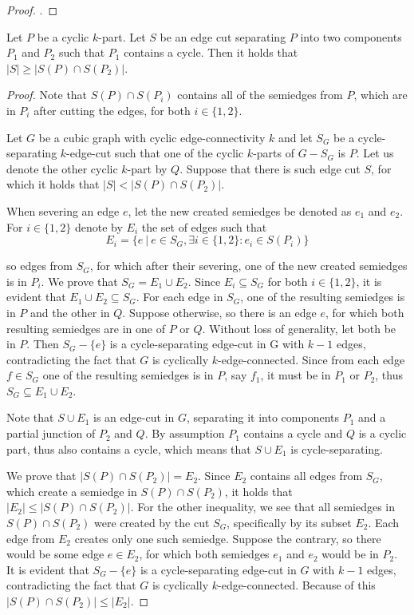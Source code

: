 \documentclass[12pt, twoside]{book}
\begin{document}
\begin{proof}
	.
\end{proof}

\begin{lemma}
	\label{lem:cyclic-part-no-short-cut}
	Let $P$ be a cyclic $k$-part. Let $S$ be an edge cut separating $P$ into two components $P_1$ and $P_2$ such that $P_1$ contains a cycle. Then it holds that ${|S| \geq |S(P)\cap S(P_2)|}$.
\end{lemma}

\begin{proof}
	Note that $S(P)\cap S(P_i)$ contains all of the semiedges from $P$, which are in $P_i$ after cutting the edges, for both $i\in\{1,2\}$.
	
	Let $G$ be a cubic graph with cyclic edge-connectivity $k$ and let $S_G$ be a cycle-separating $k$-edge-cut such that one of the cyclic $k$-parts of $G-S_G$ is $P$. Let us denote the other cyclic $k$-part by $Q$. Suppose that there is such edge cut $S$, for which it holds that $|S| < |S(P)\cap S(P_2)|$. 
	
	When severing an edge $e$, let the new created semiedges be denoted as $e_1$ and $e_2$. For $i\in\{1,2\}$ denote by $E_i$ the set of edges such that $$E_i=\{e ~|~ e\in S_G, \exists i \in \{1,2\}: e_i\in S(P_i)\}$$
	
	so edges from $S_G$, for which after their severing, one of the new created semiedges is in $P_i$. We prove that $S_G=E_1\cup E_2$. Since $E_i\subseteq S_G$ for both $i\in\{1,2\}$, it is evident that $E_1\cup E_2\subseteq S_G$. For each edge in $S_G$, one of the resulting semiedges is in $P$ and the other in $Q$. Suppose otherwise, so there is an edge $e$, for which both resulting semiedges are in one of $P$ or $Q$. Without loss of generality, let both be in $P$. Then $S_G-\{e\}$ is a cycle-separating edge-cut in G with $k-1$ edges, contradicting the fact that $G$ is cyclically $k$-edge-connected. Since from each edge $f\in S_G$ one of the resulting semiedges is in $P$, say $f_1$, it must be in $P_1$ or $P_2$, thus $S_G\subseteq E_1\cup E_2$.
	
	Note that $S\cup E_1$ is an edge-cut in $G$, separating it into components $P_1$ and a partial junction of $P_2$ and $Q$. By assumption $P_1$ contains a cycle and $Q$ is a cyclic part, thus also contains a cycle, which means that $S\cup E_1$ is cycle-separating.
	
	We prove that $|S(P)\cap S(P_2)|=E_2$. Since $E_2$ contains all edges from $S_G$, which create a semiedge in $S(P)\cap S(P_2)$, it holds that $|E_2|\leq |S(P)\cap S(P_2)|$. For the other inequality, we see that all semiedges in $S(P)\cap S(P_2)$ were created by the cut $S_G$, specifically by its subset $E_2$. Each edge from $E_2$ creates only one such semiedge. Suppose the contrary, so there would be some edge $e\in E_2$, for which both semiedges $e_1$ and $e_2$ would be in $P_2$. It is evident that $S_G-\{e\}$ is a cycle-separating edge-cut in $G$ with $k-1$ edges, contradicting the fact that $G$ is cyclically $k$-edge-connected. Because of this $|S(P)\cap S(P_2)|\leq |E_2|$. 
	

\end{proof}
\end{document}
